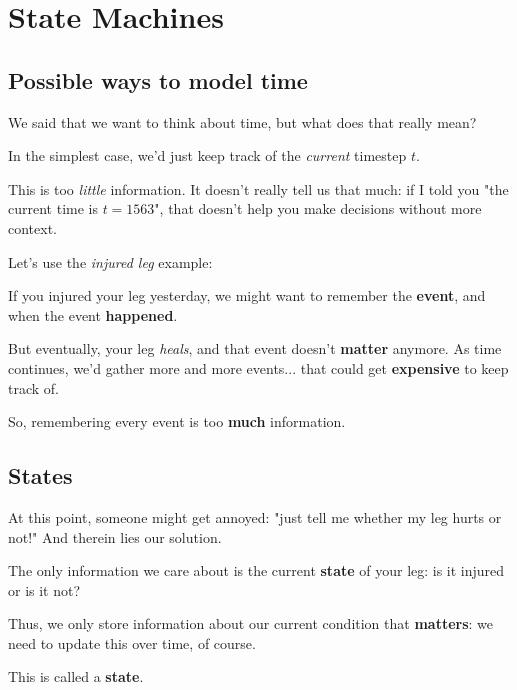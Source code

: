 \pagebreak

\section{State Machines}

    \subsection{Possible ways to model time}

        We said that we want to think about time, but what does that really mean?
        
        \miniex In the simplest case, we'd just keep track of the \textit{current} timestep $t$.
        
        This is too \textit{little} information. It doesn't really tell us that much: if I told you "the current time is $t=1563$", that doesn't help you make decisions without more context.
        
        Let's use the \textit{injured leg} example: 
        
        \miniex If you injured your leg yesterday, we might want to remember the \textbf{event}, and when the event \textbf{happened}. 
        
        But eventually, your leg \textit{heals}, and that event doesn't \textbf{matter} anymore. As time continues, we'd gather more and more events... that could get \textbf{expensive} to keep track of.
        
        So, remembering every event is too \textbf{much} information.
        
    \secdiv
    
    \subsection{States}
    
        At this point, someone might get annoyed: "just tell me whether my leg hurts or not!" And therein lies our solution.
        
        \miniex The only information we care about is the current \textbf{state} of your leg: is it injured or is it not?
        
        Thus, we only store information about our current condition that \textbf{matters}: we need to update this over time, of course.
        
        This is called a \textbf{state}.\\
        

